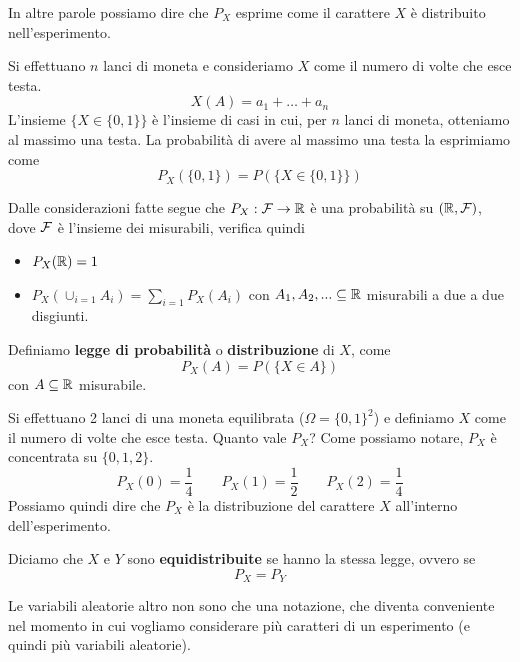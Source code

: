 \begin{tcolorbox}[colback=green!10!white, colframe=green!50!black]
	In altre parole possiamo dire che $P_X$ esprime come il carattere $X$ è distribuito
	nell'esperimento.
\end{tcolorbox}

\begin{example}
	Si effettuano $n$ lanci di moneta e consideriamo $X$ come il numero di volte che esce testa.
	\[ X(A) = a_1 + \dots + a_n \]
	L'insieme $\{ X \in \{ 0, 1 \} \}$ è l'insieme di casi in cui, per $n$ lanci di moneta,
	otteniamo al massimo una testa. La probabilità di avere al massimo una testa
	la esprimiamo come
	\[ P_X (\{0,1\}) = P (\{X \in \{0,1\}\}) \]
\end{example}

\begin{proposition}
	Dalle considerazioni fatte segue che $P_X : \mathcal{F} \to \mathbb{R}$ è una probabilità su $(\mathbb{R}, \mathcal{F})$, dove
	$\mathcal{F}$ è l'insieme dei misurabili, verifica quindi
	\begin{itemize}
		\item $P_X (\mathbb{R}) = 1$
		\item $P_X(\cup_{i=1} A_i) = \sum_{i=1} P_X(A_i)$ con $A_1, A_2, ... \subseteq \mathbb{R}$
		      misurabili a due a due disgiunti.
	\end{itemize}
\end{proposition}

\begin{definition}
	Definiamo \textbf{legge di probabilità} o \textbf{distribuzione} di $X$, come
	\[ P_X (A) = P(\{ X \in A\}) \]
	con $A \subseteq \mathbb{R}$ misurabile.
\end{definition}

\begin{example}
	Si effettuano 2 lanci di una moneta equilibrata ($\Omega = \{ 0, 1 \}^2$) e definiamo $X$
	come il numero di volte che esce testa. Quanto vale $P_X$? Come possiamo notare, $P_X$ è
	concentrata su $\{ 0, 1, 2 \}$.
	\[
		P_X (0) = \frac{1}{4} \quad \quad
		P_X (1) = \frac{1}{2} \quad \quad
		P_X (2) = \frac{1}{4}
	\]
	Possiamo quindi dire che $P_X$ è la distribuzione del carattere $X$ all'interno
	dell'esperimento.
\end{example}

\begin{definition}
	Diciamo che $X$ e $Y$ sono \textbf{equidistribuite} se hanno la stessa legge, ovvero se
	\[ P_X = P_Y \]
\end{definition}

Le variabili aleatorie altro non sono che una notazione, che diventa conveniente nel momento in cui
vogliamo considerare più caratteri di un esperimento (e quindi più variabili aleatorie).

